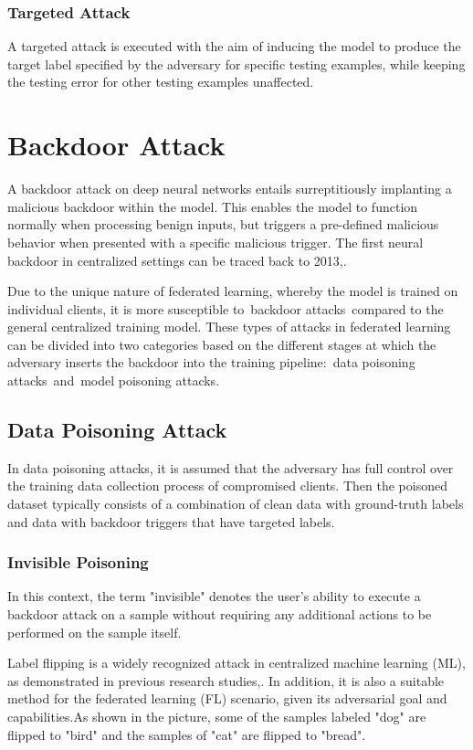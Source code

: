 \documentclass[conference]{IEEEtran}
\begin{document}
\subsubsection{Targeted Attack}A targeted attack is executed with
the aim of inducing the model to produce the target label specified by the
adversary for specific testing examples, while keeping the testing error for
other testing examples unaffected\cite{b51}.

\section{Backdoor Attack}
A backdoor attack on deep neural networks entails surreptitiously implanting
a malicious backdoor within the model. This enables the model to function
normally when processing benign inputs, but triggers a pre-defined
malicious behavior when presented with a specific malicious trigger.
The first neural backdoor in centralized settings can be traced
back to 2013\cite{b52},\cite{b53}.

Due to the unique nature of federated learning, whereby the model is trained
on individual clients, it is more susceptible to backdoor attacks compared
to the general centralized training model. These types of attacks in federated
learning can be divided into two categories based on the different stages at
which the adversary inserts the backdoor into the training pipeline: data
poisoning attacks and model poisoning attacks.

\subsection{Data Poisoning Attack}
In data poisoning attacks, it is assumed that the adversary has full control
over the training data collection process of compromised clients. Then the poisoned
dataset typically consists of a combination of clean data with ground-truth labels
and data with backdoor triggers that have targeted labels.

\subsubsection{Invisible Poisoning}
In this context, the term "invisible" denotes the user's ability to execute
a backdoor attack on a sample without requiring any additional actions to
be performed on the sample itself.

Label flipping is a widely recognized attack in centralized machine learning (ML),
as demonstrated in previous research studies\cite{b54},\cite{b55}. In addition,
it is also a suitable method for the federated learning (FL) scenario,
given its adversarial goal and capabilities\cite{b56}.As shown in the picture,
some of the samples labeled "dog" are flipped to "bird" and the samples of "cat"
are flipped to "bread".
\end{document}
